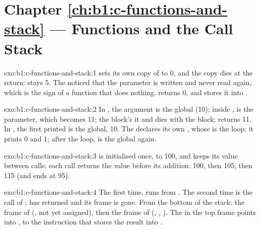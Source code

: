 \section*{Chapter \ref{ch:b1:c-functions-and-stack} --- Functions and the Call Stack}

\begin{solution}{exo:b1:c-functions-and-stack:1}
 sets its own copy of  to 0, and the copy dies at the return:  stays 5. The 
noticed that the parameter is written and never read again, which is the sign of a function that does nothing.
 returns 0, and  stores it into .
\end{solution}

\begin{solution}{exo:b1:c-functions-and-stack:2}
In , the argument is the global  (10); inside ,  is the parameter, which becomes 11;
the block's   it and dies with the block;  returns 11. In , the first
 printed is the global, 10. The  declares its own , whose  is the loop: it prints 0 and
1; after the loop,  is the global again.
\end{solution}

\begin{solution}{exo:b1:c-functions-and-stack:3}
 is initialised once, to 100, and keeps its value between calls; each call returns the value before
its addition: 100, then 105, then 115 (and  ends at 95).
\end{solution}

\begin{solution}{exo:b1:c-functions-and-stack:4}
The first time,  runs from . The second time is the call  of
;  has returned and its frame is gone. From the bottom of the stack: the frame of 
(,  not yet assigned), then the frame of  (, ,
). The  in the top frame points into , to the instruction that stores the
result into .
\end{solution}

